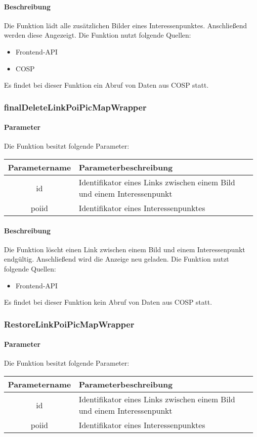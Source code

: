 \paragraph{Beschreibung} Die Funktion lädt alle zusätzlichen Bilder eines Interessenpunktes. Anschließend werden diese Angezeigt. Die Funktion nutzt folgende Quellen:
\begin{itemize}
	\item Frontend-API
	\item COSP
\end{itemize}
Es findet bei dieser Funktion ein Abruf von Daten aus {\glqq COSP\grqq} statt.
\subsubsection{finalDeleteLinkPoiPicMapWrapper}
\paragraph{Parameter} Die Funktion besitzt folgende Parameter:
\begin{table}[H]
	\begin{tabular}{|c|p{11cm}|}
		\hline
		\textbf{Parametername} & \textbf{Parameterbeschreibung} \\ \hline
		id    & Identifikator eines Links zwischen einem Bild und einem Interessenpunkt \\ \hline
		poiid & Identifikator eines Interessenpunktes \\ \hline
	\end{tabular}
\end{table}
\paragraph{Beschreibung} Die Funktion löscht einen Link zwischen einem Bild und einem Interessenpunkt endgültig. Anschließend wird die Anzeige neu geladen. Die Funktion nutzt folgende Quellen:
\begin{itemize}
	\item Frontend-API
\end{itemize}
Es findet bei dieser Funktion kein Abruf von Daten aus {\glqq COSP\grqq} statt.
\subsubsection{RestoreLinkPoiPicMapWrapper}
\paragraph{Parameter} Die Funktion besitzt folgende Parameter:
\begin{table}[H]
	\begin{tabular}{|c|p{11cm}|}
		\hline
		\textbf{Parametername} & \textbf{Parameterbeschreibung} \\ \hline
		id    & Identifikator eines Links zwischen einem Bild und einem Interessenpunkt \\ \hline
		poiid & Identifikator eines Interessenpunktes \\ \hline
	\end{tabular}
\end{table}
